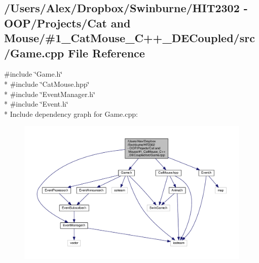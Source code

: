 \subsection{/\-Users/\-Alex/\-Dropbox/\-Swinburne/\-H\-I\-T2302 -\/ O\-O\-P/\-Projects/\-Cat and Mouse/\#1\-\_\-\-Cat\-Mouse\-\_\-\-C++\-\_\-\-D\-E\-Coupled/src/\-Game.cpp File Reference}
\label{_game_8cpp}
{\ttfamily \#include \char`\"{}Game.\-h\char`\"{}}\\*
{\ttfamily \#include \char`\"{}Cat\-Mouse.\-hpp\char`\"{}}\\*
{\ttfamily \#include \char`\"{}Event\-Manager.\-h\char`\"{}}\\*
{\ttfamily \#include \char`\"{}Event.\-h\char`\"{}}\\*
Include dependency graph for Game.\-cpp\-:
\nopagebreak
\begin{figure}[H]
\begin{center}
\leavevmode
\includegraphics[width=350pt]{_game_8cpp__incl}
\end{center}
\end{figure}
